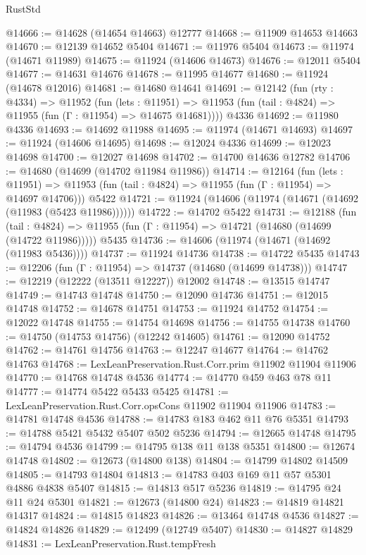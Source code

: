 \begin{lexlean}{RustStd}
\begin{coremodule}
{\begin{coremodule}
{{{{{{{{{{{{{{{{{{{{{{{{{{{{{{{{{{{{{{{{{{{{{{{{{{{{{{{{{{{{{{{{{{{{{{{{{{{{{{{{@14666 := @14628 (@14654 @14663) @12777
@14668 := @11909 @14653 @14663
@14670 := @12139 @14652 @5404
@14671 := @11976 @5404
@14673 := @11974 (@14671 @11989)
@14675 := @11924 (@14606 @14673)
@14676 := @12011 @5404
@14677 := @14631 @14676
@14678 := @11995 @14677
@14680 := @11924 (@14678 @12016)
@14681 := @14680 @14641
@14691 := @12142
    (fun (rty : @4334) =>
    @11952
      (fun (lets : @11951) =>
      @11953 (fun (tail : @4824) => @11955 (fun (Γ : @11954) => @14675 @14681))))
    @4336
@14692 := @11980 @4336
@14693 := @14692 @11988
@14695 := @11974 (@14671 @14693)
@14697 := @11924 (@14606 @14695)
@14698 := @12024 @4336
@14699 := @12023 @14698
@14700 := @12027 @14698
@14702 := @14700 @14636 @12782
@14706 := @14680 (@14699 (@14702 @11984 @11986))
@14714 := @12164
    (fun (lets : @11951) =>
    @11953 (fun (tail : @4824) => @11955 (fun (Γ : @11954) => @14697 @14706)))
    @5422
@14721 := @11924 (@14606 (@11974 (@14671 (@14692 (@11983 (@5423 @11986))))))
@14722 := @14702 @5422
@14731 := @12188
    (fun (tail : @4824) => @11955 (fun (Γ : @11954) => @14721 (@14680 (@14699 (@14722 @11986)))))
    @5435
@14736 := @14606 (@11974 (@14671 (@14692 (@11983 @5436))))
@14737 := @11924 @14736
@14738 := @14722 @5435
@14743 := @12206 (fun (Γ : @11954) => @14737 (@14680 (@14699 @14738)))
@14747 := @12219 (@12222 (@13511 @12227)) @12002
@14748 := @13515 @14747
@14749 := @14743 @14748
@14750 := @12090 @14736
@14751 := @12015 @14748
@14752 := @14678 @14751
@14753 := @11924 @14752
@14754 := @12022 @14748
@14755 := @14754 @14698
@14756 := @14755 @14738
@14760 := @14750 (@14753 @14756) (@12242 @14605)
@14761 := @12090 @14752
@14762 := @14761 @14756
@14763 := @12247 @14677
@14764 := @14762 @14763
@14768 := LexLeanPreservation.Rust.Corr.prim @11902 @11904 @11906
@14770 := @14768 @14748 @4536
@14774 := @14770 @459 @463 @78 @11
@14777 := @14774 @5422 @5433 @5425
@14781 := LexLeanPreservation.Rust.Corr.opsCons @11902 @11904 @11906
@14783 := @14781 @14748 @4536
@14788 := @14783 @183 @462 @11 @76 @5351
@14793 := @14788 @5421 @5432 @5407 @502 @5236
@14794 := @12665 @14748
@14795 := @14794 @4536
@14799 := @14795 @138 @11 @138 @5351
@14800 := @12674 @14748
@14802 := @12673 (@14800 @138)
@14804 := @14799 @14802 @14509
@14805 := @14793 @14804
@14813 := @14783 @403 @169 @11 @57 @5301 @4886 @4838 @5407
@14815 := @14813 @517 @5236
@14819 := @14795 @24 @11 @24 @5301
@14821 := @12673 (@14800 @24)
@14823 := @14819 @14821 @14317
@14824 := @14815 @14823
@14826 := @13464 @14748 @4536
@14827 := @14824 @14826
@14829 := @12499 (@12749 @5407)
@14830 := @14827 @14829
@14831 := LexLeanPreservation.Rust.tempFresh
}}}}}}}}}}}}}}}}}}}}}}}}}}}}}}}}}}}}}}}}}}}}}}}}}}}}}}}}}}}}}}}}}}}}}}}}}}}}}}}}
\end{coremodule}}
\end{coremodule}
\end{lexlean}
